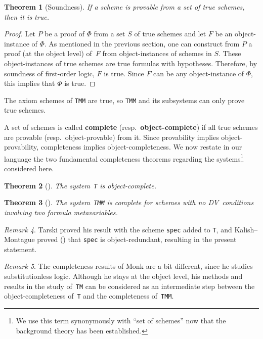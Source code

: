 \documentclass[11pt]{article}
\newcommand*{\define}[1]{\textbf{#1}}%
\theoremstyle{plain}
\newtheorem{theorem}{Theorem}[section]
\theoremstyle{definition}
\theoremstyle{remark}
\newtheorem{remark}[theorem]{Remark}
\begin{document}
\begin{theorem}[Soundness]
If a scheme is provable from a set of true schemes, then it is true.
\end{theorem}

\begin{proof}
Let $P$ be a proof of $\Phi$ from a set $S$ of true schemes and let $F$ be an object-instance of $\Phi$.
As mentioned in the previous section, one can construct from $P$ a proof (at the object level)
of~$F$ from object-instances of schemes in $S$.
These object-instances of true schemes are true formulas with hypotheses.
Therefore, by soundness of first-order logic, $F$ is true.
Since $F$ can be any object-instance of $\Phi$, this implies that $\Phi$ is true.
\end{proof}

The axiom schemes of \texttt{TMM} are true, so \texttt{TMM} and its subsystems can only prove true
schemes.

A set of schemes is called \define{complete} (resp.\ \define{object-complete}) if all true schemes
are provable (resp.\ object-provable) from it.
Since provability implies object-provability, completeness implies object-completeness.
We now restate in our language the two fundamental completeness theorems regarding the
systems\footnote{We use this term synonymously with ``set of schemes\rlap{,}'' now that the
background theory has been established.} considered here.

\begin{theorem}[{\cite[Thm.~5]{tarski}}]
\label{thm:tarski}
The system~\texttt{T} is object-complete.
\end{theorem}

\begin{theorem}[{\cite[Thm.~9.7]{megill}}]
The system~\texttt{TMM} is complete for schemes with no DV~conditions involving two formula metavariables.
\end{theorem}

\begin{remark}
Tarski proved his result with the scheme \texttt{spec} added to \texttt{T}, and Kalish--Montague
proved (\cite[Lem.~9]{km}) that \texttt{spec} is object-redundant, resulting in the present statement.
\end{remark}

\begin{remark}
The completeness results of Monk are a bit different, since he studies substitutionless logic.
Although he stays at the object level, his methods and results in the study of~\texttt{TM} can be
considered as an intermediate step between the object-completeness of~\texttt{T} and the
completeness of~\texttt{TMM}.
\end{remark}
\end{document}
